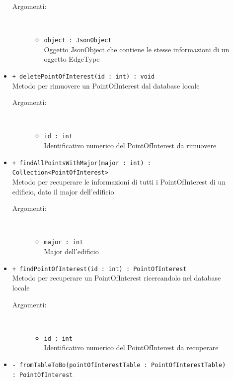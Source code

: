 \documentclass[../DefinizioneDiProdotto.tex]{subfiles}
\begin{document}
\begin{description}
\begin{itemize}
 \begin{description}
\item[Argomenti:] \
\begin{itemize}
\item \texttt{object : JsonObject}\\
Oggetto JsonObject che contiene le stesse informazioni di un oggetto EdgeType\end{itemize}
\end{description}
\item \texttt{+ deletePointOfInterest(id : int) : void}\\
Metodo per rimuovere un PointOfInterest dal database locale
 \begin{description}
\item[Argomenti:] \
\begin{itemize}
\item \texttt{id : int}\\
Identificativo numerico del PointOfInterest da rimuovere\end{itemize}
\end{description}
\item \texttt{+ findAllPointsWithMajor(major : int) : Collection<PointOfInterest>}\\
Metodo per recuperare le informazioni di tutti i PointOfInterest di un edificio, dato il major dell'edificio
 \begin{description}
\item[Argomenti:] \
\begin{itemize}
\item \texttt{major : int}\\
Major dell'edificio\end{itemize}
\end{description}
\item \texttt{+ findPointOfInterest(id : int) : PointOfInterest}\\
Metodo per recuperare un PointOfInterest ricercandolo nel database locale
 \begin{description}
\item[Argomenti:] \
\begin{itemize}
\item \texttt{id : int}\\
Identificativo numerico del PointOfInterest da recuperare\end{itemize}
\end{description}
\item \texttt{- fromTableToBo(pointOfInterestTable : PointOfInterestTable) : PointOfInterest}\\

\end{itemize}
\end{description}
\end{document}
